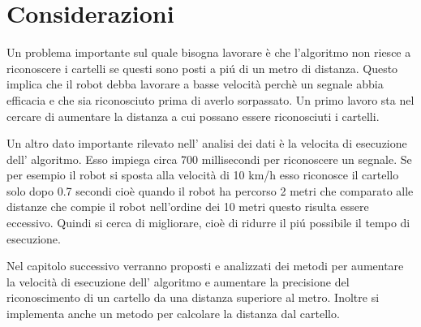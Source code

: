 \section{Considerazioni}

	Un problema importante sul quale bisogna lavorare è che l'algoritmo non riesce a riconoscere i cartelli se questi sono posti a pi\'u di un metro di distanza. Questo implica che il robot debba lavorare a basse velocità perchè un segnale abbia efficacia e che sia riconosciuto prima di averlo sorpassato. Un primo lavoro sta nel cercare di aumentare la distanza a cui possano essere riconosciuti i cartelli.

	Un altro dato importante rilevato nell' analisi dei dati è la velocita di esecuzione dell' algoritmo. Esso impiega circa 700 millisecondi per riconoscere un segnale. Se per esempio il robot si sposta alla velocità di 10 km/h esso riconosce il cartello solo dopo 0.7 secondi cioè quando il robot ha percorso 2 metri che comparato alle distanze che compie il robot nell'ordine dei 10 metri questo risulta essere eccessivo. Quindi si cerca di migliorare, cioè di ridurre il pi\'u possibile il tempo di esecuzione.
	
	Nel capitolo successivo verranno proposti e analizzati dei metodi per aumentare la velocità di esecuzione dell' algoritmo e aumentare la precisione del riconoscimento di un cartello da una distanza superiore al metro. Inoltre si implementa anche un metodo per calcolare la distanza dal cartello.